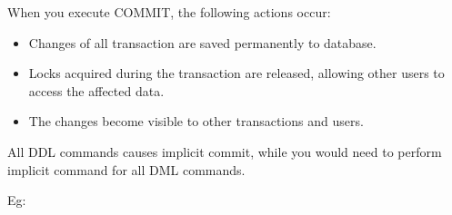 
\begin{flushleft}
	
	When you execute COMMIT, the following actions occur:
		\begin{itemize}
			\item Changes of all transaction are saved permanently to database.
			\item Locks acquired during the transaction are released, allowing other users to access the affected data.
			\item The changes become visible to other transactions and users.
		\end{itemize}
	All DDL commands causes implicit commit, while you would need to perform implicit command for all DML commands.

	\bigskip	
	Eg:
\end{flushleft}

\newpage
